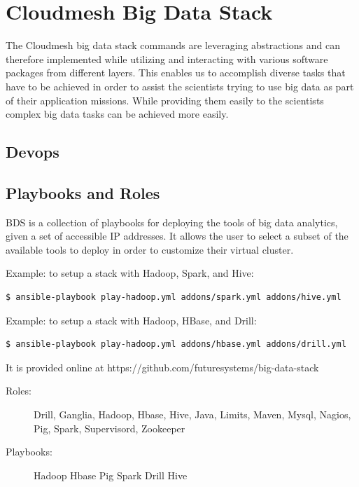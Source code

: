 \section{Cloudmesh Big Data Stack}\label{S:cm-bds}

The Cloudmesh big data stack commands are leveraging abstractions and
can therefore implemented while utilizing and interacting with various
software packages from different layers. This enables us to accomplish
diverse tasks that have to be achieved in order to assist the
scientists trying to use big data as part of their application
missions. While providing them easily to the scientists complex big
data tasks can be achieved more easily.

\subsection{Devops}


\subsection{Playbooks and Roles}

BDS is a collection of playbooks for deploying the tools of big data
analytics, given a set of accessible IP addresses. It allows the user
to select a subset of the available tools to deploy in order to
customize their virtual cluster.

Example: to setup a stack with Hadoop, Spark, and Hive:
\begin{Verbatim}
$ ansible-playbook play-hadoop.yml addons/spark.yml addons/hive.yml
\end{Verbatim}

Example: to setup a stack with Hadoop, HBase, and Drill:

\begin{Verbatim}
$ ansible-playbook play-hadoop.yml addons/hbase.yml addons/drill.yml
\end{Verbatim}

It is provided online at https://github.com/futuresystems/big-data-stack

\begin{description}

\item[Roles:]
Drill,
Ganglia,
Hadoop,
Hbase,
Hive,
Java,
Limits,
Maven,
Mysql,
Nagios,
Pig,
Spark,
Supervisord,
Zookeeper

\item[Playbooks:]
Hadoop
Hbase
Pig
Spark
Drill
Hive
\end{description}

